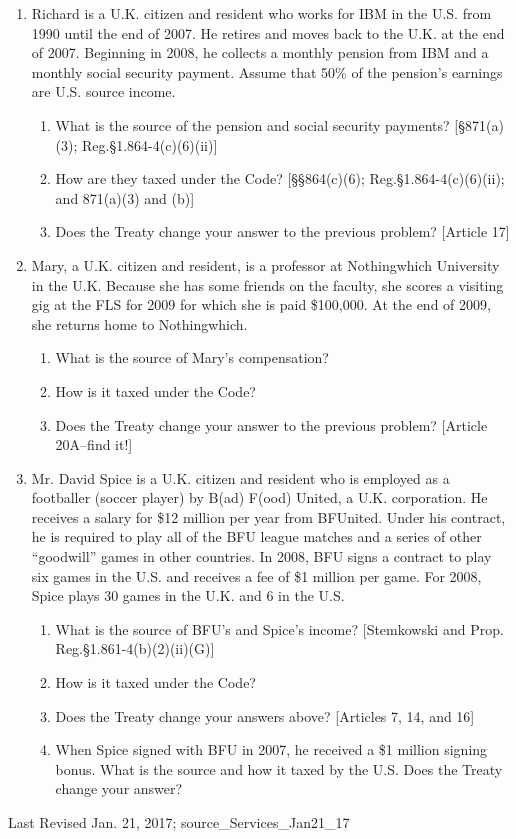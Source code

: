 \begin{select}
\begin{enumerate}
				\item Richard is a U.K. citizen and resident who works for IBM in the U.S. from 1990 until the end of 2007.  He retires and moves back to the U.K. at the end of 2007.  Beginning in 2008, he collects a monthly pension from IBM and a monthly social security payment.   Assume that 50\% of the pension's earnings are U.S. source income.			
				\begin{enumerate}
					\item What is the source of the pension and social security payments?   [\S 871(a)(3); Reg.\@ \S 1.864-4(c)(6)(ii)]
					\item How are they taxed under the Code?  [\S\S 864(c)(6); Reg.\@ \S 1.864-4(c)(6)(ii); and 871(a)(3) and (b)]
					\item Does the Treaty change your answer to the previous problem? [Article 17]
				\end{enumerate}
				
				\item Mary, a U.K. citizen and resident, is a professor at Nothingwhich University in the U.K.  Because she has some friends on the faculty, she scores a visiting gig at the FLS for 2009 for which she is paid \$100,000.  At the end of 2009, she returns home to Nothingwhich.  
				\begin{enumerate}
					\item What is the source of Mary's compensation?   
					\item How is it taxed under the Code? 
					\item Does the Treaty change your answer to the previous problem? [Article 20A--find it!]
				\end{enumerate}

			\item Mr. David Spice is a U.K. citizen and resident who is employed as a footballer (soccer player) by B(ad) F(ood) United, a U.K. corporation.  He receives a salary for \$12 million per year from BFUnited.  Under his contract, he is required to play all of the BFU league matches and a series of other ``goodwill'' games in other countries.  In 2008, BFU signs a contract to play six games in the U.S. and receives a fee of \$1 million per game.  For 2008, Spice plays 30 games in the U.K. and 6 in the U.S.
		\begin{enumerate}
			\item What is the source of BFU's and Spice's income? [Stemkowski and Prop. Reg.\@ \S 1.861-4(b)(2)(ii)(G)]
			\item How is it taxed under the Code? 
			\item Does the Treaty change your answers above? [Articles 7, 14, and 16]
			\item When Spice signed with BFU in 2007, he received a \$1 million signing bonus.  What is the source and how it taxed by the U.S.  Does the Treaty change your answer?
		\end{enumerate}	
				
			\end{enumerate}
		\end{select}

\begin{framed}
Last Revised Jan. 21, 2017; source\_Services\_Jan21\_17
\end{framed}
